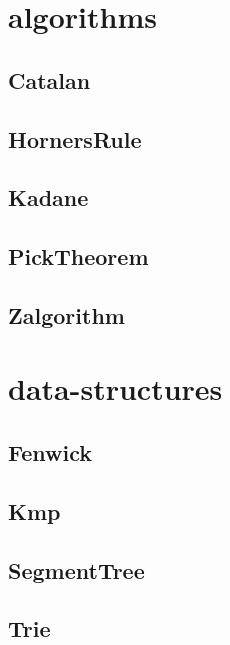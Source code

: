 \section{algorithms}
\subsection{ Catalan}
\raggedbottom
\hrulefill
\subsection{ HornersRule}
\raggedbottom
\hrulefill
\subsection{ Kadane}
\raggedbottom
\hrulefill
\subsection{ PickTheorem}
\raggedbottom
\hrulefill
\subsection{ Zalgorithm}
\raggedbottom
\hrulefill

\section{data-structures}
\subsection{ Fenwick}
\raggedbottom
\hrulefill
\subsection{ Kmp}
\raggedbottom
\hrulefill
\subsection{ SegmentTree}
\raggedbottom
\hrulefill
\subsection{ Trie}
\raggedbottom
\hrulefill
